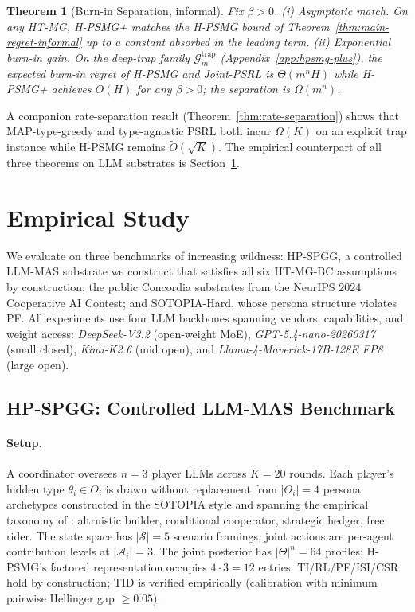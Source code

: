 ﻿\documentclass{article}
\newtheorem{theorem}{Theorem}[section]
\def\textsuperscript#1{#1}%
\begin{document}
\begin{theorem}[Burn-in Separation, informal]\label{thm:hpsmg-plus}
Fix $\beta>0$. (i) \emph{Asymptotic match.} On any HT-MG, H-PSMG\textsuperscript{+} matches the H-PSMG bound of Theorem~\ref{thm:main-regret-informal} up to a constant absorbed in the leading term. (ii) \emph{Exponential burn-in gain.} On the deep-trap family $\mathcal G_m^{\mathrm{trap}}$ (Appendix~\ref{app:hpsmg-plus}), the expected burn-in regret of H-PSMG and Joint-PSRL is $\Theta(m^n H)$ while H-PSMG\textsuperscript{+} achieves $O(H)$ for any $\beta>0$; the separation is $\Omega(m^n)$.
\end{theorem}

A companion rate-separation result (Theorem~\ref{thm:rate-separation}) shows that MAP-type-greedy and type-agnostic PSRL both incur $\Omega(K)$ on an explicit trap instance while H-PSMG remains $\tilde O(\sqrt K)$. The empirical counterpart of all three theorems on LLM substrates is Section~\ref{sec:experiments-llm}.

\section{Empirical Study}
\label{sec:experiments-llm}

We evaluate on three benchmarks of increasing wildness: HP-SPGG, a controlled LLM-MAS substrate we construct that satisfies all six HT-MG-BC assumptions by construction; the public Concordia substrates from the NeurIPS 2024 Cooperative AI Contest; and SOTOPIA-Hard, whose persona structure violates PF. All experiments use four LLM backbones spanning vendors, capabilities, and weight access: \emph{DeepSeek-V3.2} (open-weight MoE), \emph{GPT-5.4-nano-20260317} (small closed), \emph{Kimi-K2.6} (mid open), and \emph{Llama-4-Maverick-17B-128E FP8} (large open).

\subsection{HP-SPGG: Controlled LLM-MAS Benchmark}
\label{sec:hp-spgg}

\paragraph{Setup.} A coordinator oversees $n{=}3$ player LLMs across $K{=}20$ rounds. Each player's hidden type $\theta_i\!\in\!\Theta_i$ is drawn without replacement from $|\Theta_i|{=}4$ persona archetypes constructed in the SOTOPIA style \citep{zhou2024sotopia} and spanning the empirical taxonomy of \citet{fischbacher2001people}: altruistic builder, conditional cooperator, strategic hedger, free rider. The state space has $|\mathcal S|{=}5$ scenario framings, joint actions are per-agent contribution levels at $|\mathcal A_i|{=}3$. The joint posterior has $|\Theta|^n{=}64$ profiles; H-PSMG's factored representation occupies $4\cdot 3{=}12$ entries. TI/RL/PF/ISI/CSR hold by construction; TID is verified empirically (calibration with minimum pairwise Hellinger gap $\geq 0.05$).
\end{document}
